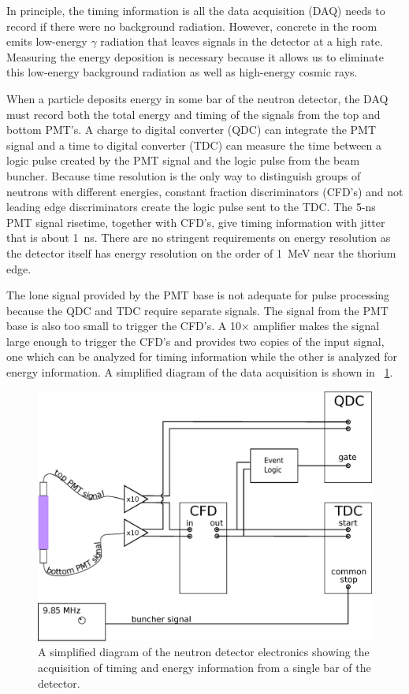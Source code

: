 In principle, the timing information is all the data acquisition (DAQ) needs to record if there were no background radiation.  However, concrete in the room emits low-energy $\gamma$ radiation that leaves signals in the detector at a high rate.  Measuring the energy deposition is necessary because it allows us to eliminate this low-energy background radiation as well as high-energy cosmic rays.

When a particle deposits energy in some bar of the neutron detector, the DAQ must record both the total energy and timing of the signals from the top and bottom PMT's.  A charge to digital converter (QDC) can integrate the PMT signal and a time to digital converter (TDC) can measure the time between a logic pulse created by the PMT signal and the logic pulse from the beam buncher.  Because time resolution is the only way to distinguish groups of neutrons with different energies, constant fraction discriminators (CFD's) and not leading edge discriminators create the logic pulse sent to the TDC.  The 5-ns PMT signal risetime, together with CFD's, give timing information with jitter that is about 1~ns.  There are no stringent requirements on energy resolution as the detector itself has energy resolution on the order of 1~MeV near the thorium edge.

The lone signal provided by the PMT base is not adequate for pulse processing because the QDC and TDC require separate signals.  The signal from the PMT base is also too small to trigger the CFD's.  A 10$\times$ amplifier makes the signal large enough to trigger the CFD's and provides two copies of the input signal, one which can be analyzed for timing information while the other is analyzed for energy information.  A simplified diagram of the data acquisition is shown in {\fig}~\ref{fig:simpleElectronics}.

\begin{figure}[htp]
\centering
\includegraphics[width=1.0\textwidth]{figures/basic_electronics.eps}
\caption{A simplified diagram of the neutron detector electronics showing the acquisition of timing and energy information from a single bar of the detector.}
\label{fig:simpleElectronics}
\end{figure}

